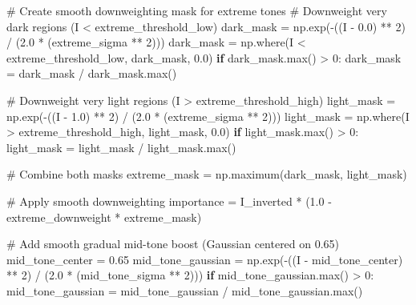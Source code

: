 \documentclass[
  letterpaper,
  DIV=11,
  numbers=noendperiod]{scrartcl}
\newenvironment{Shaded}{\begin{snugshade}}{\end{snugshade}}
\newcommand{\BuiltInTok}[1]{\textcolor[rgb]{0.00,0.23,0.31}{#1}}
\newcommand{\CommentTok}[1]{\textcolor[rgb]{0.37,0.37,0.37}{#1}}
\newcommand{\ControlFlowTok}[1]{\textcolor[rgb]{0.00,0.23,0.31}{\textbf{#1}}}
\newcommand{\DecValTok}[1]{\textcolor[rgb]{0.68,0.00,0.00}{#1}}
\newcommand{\FloatTok}[1]{\textcolor[rgb]{0.68,0.00,0.00}{#1}}
\newcommand{\NormalTok}[1]{\textcolor[rgb]{0.00,0.23,0.31}{#1}}
\newcommand{\OperatorTok}[1]{\textcolor[rgb]{0.37,0.37,0.37}{#1}}
\begin{document}
\begin{Shaded}
\begin{Highlighting}[]
    \CommentTok{\# Create smooth downweighting mask for extreme tones}
    \CommentTok{\# Downweight very dark regions (I \textless{} extreme\_threshold\_low)}
\NormalTok{    dark\_mask }\OperatorTok{=}\NormalTok{ np.exp(}\OperatorTok{{-}}\NormalTok{((I }\OperatorTok{{-}} \FloatTok{0.0}\NormalTok{) }\OperatorTok{**} \DecValTok{2}\NormalTok{) }\OperatorTok{/}\NormalTok{ (}\FloatTok{2.0} \OperatorTok{*}\NormalTok{ (extreme\_sigma }\OperatorTok{**} \DecValTok{2}\NormalTok{)))}
\NormalTok{    dark\_mask }\OperatorTok{=}\NormalTok{ np.where(I }\OperatorTok{\textless{}}\NormalTok{ extreme\_threshold\_low, dark\_mask, }\FloatTok{0.0}\NormalTok{)}
    \ControlFlowTok{if}\NormalTok{ dark\_mask.}\BuiltInTok{max}\NormalTok{() }\OperatorTok{\textgreater{}} \DecValTok{0}\NormalTok{:}
\NormalTok{        dark\_mask }\OperatorTok{=}\NormalTok{ dark\_mask }\OperatorTok{/}\NormalTok{ dark\_mask.}\BuiltInTok{max}\NormalTok{()}
    
    \CommentTok{\# Downweight very light regions (I \textgreater{} extreme\_threshold\_high)}
\NormalTok{    light\_mask }\OperatorTok{=}\NormalTok{ np.exp(}\OperatorTok{{-}}\NormalTok{((I }\OperatorTok{{-}} \FloatTok{1.0}\NormalTok{) }\OperatorTok{**} \DecValTok{2}\NormalTok{) }\OperatorTok{/}\NormalTok{ (}\FloatTok{2.0} \OperatorTok{*}\NormalTok{ (extreme\_sigma }\OperatorTok{**} \DecValTok{2}\NormalTok{)))}
\NormalTok{    light\_mask }\OperatorTok{=}\NormalTok{ np.where(I }\OperatorTok{\textgreater{}}\NormalTok{ extreme\_threshold\_high, light\_mask, }\FloatTok{0.0}\NormalTok{)}
    \ControlFlowTok{if}\NormalTok{ light\_mask.}\BuiltInTok{max}\NormalTok{() }\OperatorTok{\textgreater{}} \DecValTok{0}\NormalTok{:}
\NormalTok{        light\_mask }\OperatorTok{=}\NormalTok{ light\_mask }\OperatorTok{/}\NormalTok{ light\_mask.}\BuiltInTok{max}\NormalTok{()}
    
    \CommentTok{\# Combine both masks}
\NormalTok{    extreme\_mask }\OperatorTok{=}\NormalTok{ np.maximum(dark\_mask, light\_mask)}
    
    \CommentTok{\# Apply smooth downweighting}
\NormalTok{    importance }\OperatorTok{=}\NormalTok{ I\_inverted }\OperatorTok{*}\NormalTok{ (}\FloatTok{1.0} \OperatorTok{{-}}\NormalTok{ extreme\_downweight }\OperatorTok{*}\NormalTok{ extreme\_mask)}
    
    \CommentTok{\# Add smooth gradual mid{-}tone boost (Gaussian centered on 0.65)}
\NormalTok{    mid\_tone\_center }\OperatorTok{=} \FloatTok{0.65}
\NormalTok{    mid\_tone\_gaussian }\OperatorTok{=}\NormalTok{ np.exp(}\OperatorTok{{-}}\NormalTok{((I }\OperatorTok{{-}}\NormalTok{ mid\_tone\_center) }\OperatorTok{**} \DecValTok{2}\NormalTok{) }\OperatorTok{/}\NormalTok{ (}\FloatTok{2.0} \OperatorTok{*}\NormalTok{ (mid\_tone\_sigma }\OperatorTok{**} \DecValTok{2}\NormalTok{)))}
    \ControlFlowTok{if}\NormalTok{ mid\_tone\_gaussian.}\BuiltInTok{max}\NormalTok{() }\OperatorTok{\textgreater{}} \DecValTok{0}\NormalTok{:}
\NormalTok{        mid\_tone\_gaussian }\OperatorTok{=}\NormalTok{ mid\_tone\_gaussian }\OperatorTok{/}\NormalTok{ mid\_tone\_gaussian.}\BuiltInTok{max}\NormalTok{()}
    

\end{Highlighting}
\end{Shaded}
\end{document}
